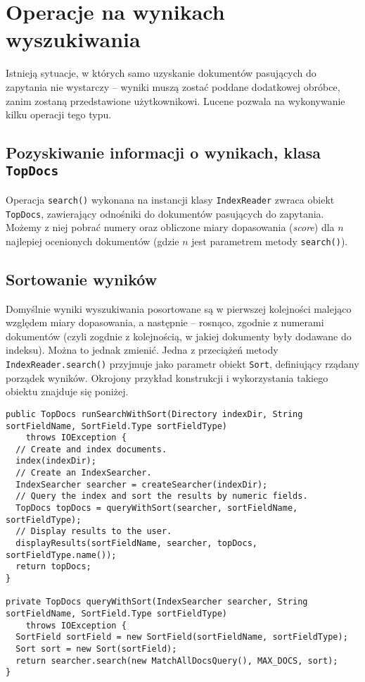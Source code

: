 \chapter{Operacje na wynikach wyszukiwania}

Istnieją sytuacje, w których samo uzyskanie dokumentów pasujących do zapytania nie wystarczy -- wyniki muszą zostać poddane dodatkowej obróbce, zanim zostaną przedstawione użytkownikowi. Lucene pozwala na wykonywanie kilku operacji tego typu.

\section{Pozyskiwanie informacji o wynikach, klasa \texttt{TopDocs}}

Operacja \texttt{search()} wykonana na instancji klasy \texttt{IndexReader} zwraca obiekt \texttt{TopDocs}, zawierający odnośniki do dokumentów pasujących do zapytania. Możemy z niej pobrać numery oraz obliczone miary dopasowania (\emph{score}) dla $n$ najlepiej ocenionych dokumentów (gdzie $n$ jest parametrem metody \texttt{search()}).

\section{Sortowanie wyników}

Domyślnie wyniki wyszukiwania posortowane są w pierwszej kolejności malejąco względem miary dopasowania, a następnie -- rosnąco, zgodnie z numerami dokumentów (czyli zogdnie z kolejnością, w jakiej dokumenty były dodawane do indeksu). Można to jednak zmienić. Jedna z przeciążeń metody \texttt{IndexReader.search()} przyjmuje jako parametr obiekt \texttt{Sort}, definiujący rządany porządek wyników. Okrojony przykład konstrukcji i wykorzystania takiego obiektu znajduje się poniżej.

\begin{lstlisting}
public TopDocs runSearchWithSort(Directory indexDir, String sortFieldName, SortField.Type sortFieldType)
    throws IOException {
  // Create and index documents.  
  index(indexDir);
  // Create an IndexSearcher.
  IndexSearcher searcher = createSearcher(indexDir);
  // Query the index and sort the results by numeric fields.
  TopDocs topDocs = queryWithSort(searcher, sortFieldName, sortFieldType);
  // Display results to the user.
  displayResults(sortFieldName, searcher, topDocs, sortFieldType.name());
  return topDocs;
}

private TopDocs queryWithSort(IndexSearcher searcher, String sortFieldName, SortField.Type sortFieldType)
    throws IOException {
  SortField sortField = new SortField(sortFieldName, sortFieldType);
  Sort sort = new Sort(sortField);
  return searcher.search(new MatchAllDocsQuery(), MAX_DOCS, sort);
}
\end{lstlisting}

